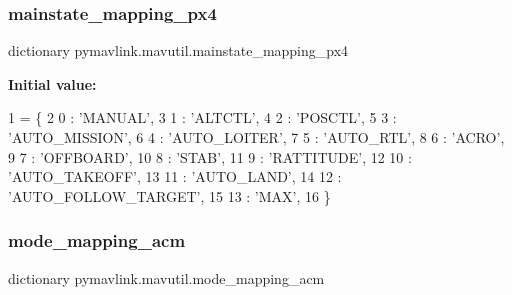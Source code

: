 \subsubsection{\texorpdfstring{mainstate\+\_\+mapping\+\_\+px4}{mainstate\_mapping\_px4}}
{\footnotesize\ttfamily dictionary pymavlink.\+mavutil.\+mainstate\+\_\+mapping\+\_\+px4}

{\bfseries Initial value\+:}
\begin{DoxyCode}
1 =  \{
2     0 : \textcolor{stringliteral}{'MANUAL'},
3     1 : \textcolor{stringliteral}{'ALTCTL'},
4     2 : \textcolor{stringliteral}{'POSCTL'},
5     3 : \textcolor{stringliteral}{'AUTO\_MISSION'},
6     4 : \textcolor{stringliteral}{'AUTO\_LOITER'},
7     5 : \textcolor{stringliteral}{'AUTO\_RTL'},
8     6 : \textcolor{stringliteral}{'ACRO'},
9     7 : \textcolor{stringliteral}{'OFFBOARD'},
10     8 : \textcolor{stringliteral}{'STAB'},
11     9 : \textcolor{stringliteral}{'RATTITUDE'},
12     10 : \textcolor{stringliteral}{'AUTO\_TAKEOFF'},
13     11 : \textcolor{stringliteral}{'AUTO\_LAND'},
14     12 : \textcolor{stringliteral}{'AUTO\_FOLLOW\_TARGET'},
15     13 : \textcolor{stringliteral}{'MAX'},
16 \}
\end{DoxyCode}
\mbox{\label{namespacepymavlink_1_1mavutil_a3da8a514b4af72e60922ae1a662556be}} 
\subsubsection{\texorpdfstring{mode\+\_\+mapping\+\_\+acm}{mode\_mapping\_acm}}
{\footnotesize\ttfamily dictionary pymavlink.\+mavutil.\+mode\+\_\+mapping\+\_\+acm}

